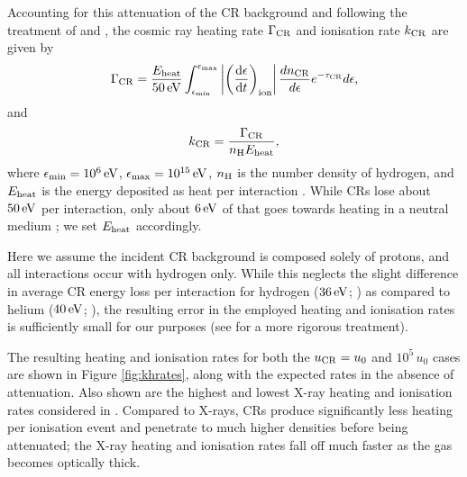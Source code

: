 \documentclass[usenatbib]{mn2e}
\newcommand{\ev}{\,{\rm eV}}
\newcommand{\ucr}{{u}_{\rm \small CR}}
\begin{document}
Accounting for this attenuation of the CR background and following the treatment of \citet{StacyBromm2007} and \citet{InayoshiOmukai2011}, the cosmic ray heating rate $\Gamma_{\rm \small CR}$ and ionisation rate $k_{\rm \small CR}$ are given by
\begin{equation}
\Gamma_{\rm \small CR} = 
    \frac{ E_{\rm \small heat}}{50\,{\rm \small eV}} 
    \int_{\epsilon_{\rm min}}^{\epsilon_{\rm max}} 
    \left| \left( \frac{{\rm d}\epsilon} {{\rm d}t} \right)_{\rm ion} \right|
    \frac{dn_{\rm \tiny CR}}{d\epsilon} e^{-\tau_{\rm \small CR}} d\epsilon,
\end{equation}
and 
\begin{equation}
k_{\rm \small CR} = \frac{\Gamma_{\rm \small CR}}{ n_{\rm \small H} E_{\rm \small heat}},
\end{equation}
where $\epsilon_{\rm min} = 10^6\ev$, $\epsilon_{\rm max}= 10^{15}\ev$, $n_{\rm \small H}$ is the number density of hydrogen, and $E_{\rm \small heat}$ is the energy deposited as heat per interaction \citep{Schlickeiser2002}.
While CRs lose about $50\ev$ per interaction, only about $6\ev$ of that goes towards heating in a neutral medium \citep{SpitzerScott1969,ShullvanSteenberg1985}; we set $E_{\rm \small heat}$ accordingly.

Here we assume the incident CR background is composed solely of protons, and all interactions occur with hydrogen only.  
While this neglects the slight difference in average CR energy loss per interaction for hydrogen ($36\ev$; \citealt{BakkerSegre1951}) as compared to helium ($40\ev$; \citealt{WeissBernstein1956}), the resulting error in the employed heating and ionisation rates is sufficiently small for our purposes (see \citealt{JascheCiardiEnsslin2007} for a more rigorous treatment). 

The resulting heating and ionisation rates for both the $\ucr=u_0$ and $10^5\,u_0$ cases are shown in Figure \ref{fig:khrates}, along with the expected rates in the absence of attenuation.
Also shown are the highest and lowest X-ray heating and ionisation rates considered in \citet{Hummeletal2015}. 
Compared to X-rays, CRs produce significantly less heating per ionisation event and penetrate to much higher densities before being attenuated; the X-ray heating and ionisation rates fall off much faster as the gas becomes optically thick.
\end{document}

